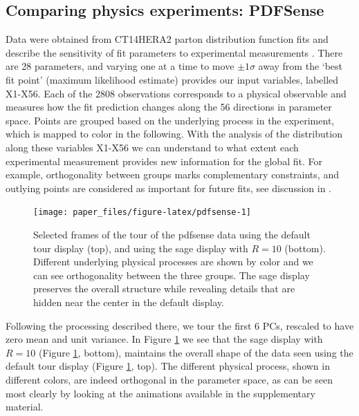 \documentclass[]{interact}
\theoremstyle{plain}%
\theoremstyle{definition}
\theoremstyle{remark}
\begin{document}
\hypertarget{sec:appl3}{%
\subsection{Comparing physics experiments: PDFSense}\label{sec:appl3}}

Data were obtained from CT14HERA2 parton distribution function fits and
describe the sensitivity of fit parameters to experimental measurements
\citep{Wang:2018heo}. There are 28 parameters, and varying one at a time
to move \(\pm 1 \sigma\) away from the `best fit point' (maximum
likelihood estimate) provides our input variables, labelled X1-X56. Each
of the 2808 observations corresponds to a physical observable and
measures how the fit prediction changes along the 56 directions in
parameter space. Points are grouped based on the underlying process in
the experiment, which is mapped to color in the following. With the
analysis of the distribution along these variables X1-X56 we can
understand to what extent each experimental measurement provides new
information for the global fit. For example, orthogonality between
groups marks complementary constraints, and outlying points are
considered as important for future fits, see discussion in
\citet{Cook:2018mvr}.

\begin{figure}

{\centering \texttt{[image: paper\_files/figure-latex/pdfsense-1]} 

}

\caption{Selected frames of the tour of the pdfsense data using the default tour display (top), and using the sage display with $R=10$ (bottom). Different underlying physical processes are shown by color and we can see orthogonality between the three groups. The sage display preserves the overall structure while revealing details that are hidden near the center in the default display.}\label{fig:pdfsense}
\end{figure}

Following the processing described there, we tour the first 6 PCs,
rescaled to have zero mean and unit variance. In Figure
\ref{fig:pdfsense} we see that the sage display with \(R = 10\) (Figure
\ref{fig:pdfsense}, bottom), maintains the overall shape of the data
seen using the default tour display (Figure \ref{fig:pdfsense}, top).
The different physical process, shown in different colors, are indeed
orthogonal in the parameter space, as can be seen most clearly by
looking at the animations available in the supplementary material.
\end{document}
